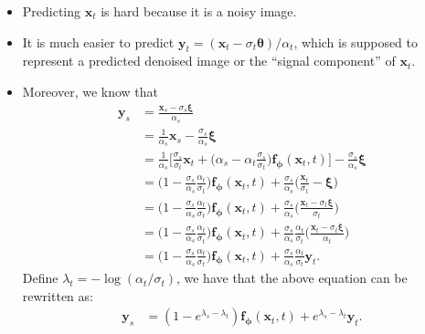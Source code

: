 \documentclass[10pt]{article}
\newcommand{\ve}[1]{\mathbf{#1}}
\newcommand{\ves}[1]{\boldsymbol{#1}}
\begin{document}
\begin{itemize}
  \item Predicting $\ve{x}_t$ is hard because it is a noisy image.
  
  \item It is much easier to predict $\ve{y}_t = (\ve{x}_t - \sigma_t \ves{\theta}) / \alpha_t$, which is supposed to represent a predicted denoised image or the ``signal component'' of $\ve{x}_t$.
  
  \item Moreover, we know that
  \begin{align*}
    \ve{y}_s 
    &= \frac{\ve{x}_s - \sigma_s \ves{\xi}}{\alpha_s} \\
    &= \frac{1}{\alpha_s} \ve{x}_s - \frac{\sigma_s}{\alpha_s} \ves{\xi} \\
    &= \frac{1}{\alpha_s} \bigg[ \frac{\sigma_s}{\sigma_t} \ve{x}_t + \bigg( \alpha_s - \alpha_t \frac{\sigma_s}{\sigma_t} \bigg) \ve{f}_{\ves{\phi}}(\ve{x}_t, t) \bigg] - \frac{\sigma_s}{\alpha_s} \ves{\xi} \\
    &= \bigg( 1 - \frac{\sigma_s}{\alpha_s} \frac{\alpha_t}{\sigma_t} \bigg) \ve{f}_{\ves{\phi}}(\ve{x}_t, t) 
    + \frac{\sigma_s}{\alpha_s} \bigg(\frac{\ve{x}_t}{\sigma_t} - \ves{\xi} \bigg) \\
    &= \bigg( 1 - \frac{\sigma_s}{\alpha_s} \frac{\alpha_t}{\sigma_t} \bigg) \ve{f}_{\ves{\phi}}(\ve{x}_t, t) 
    + \frac{\sigma_s}{\alpha_s} \bigg(\frac{\ve{x}_t - \sigma_t \ves{\xi} }{\sigma_t} \bigg) \\
    &= \bigg( 1 - \frac{\sigma_s}{\alpha_s} \frac{\alpha_t}{\sigma_t} \bigg) \ve{f}_{\ves{\phi}}(\ve{x}_t, t) 
    + \frac{\sigma_s}{\alpha_s} \frac{\alpha_t}{\sigma_t} \bigg(\frac{\ve{x}_t - \sigma_t \ves{\xi} }{\alpha_t} \bigg) \\
    &= \bigg( 1 - \frac{\sigma_s}{\alpha_s} \frac{\alpha_t}{\sigma_t} \bigg) \ve{f}_{\ves{\phi}}(\ve{x}_t, t) 
    + \frac{\sigma_s}{\alpha_s} \frac{\alpha_t}{\sigma_t} \ve{y}_t.
  \end{align*}
  Define $\lambda_t = -\log (\alpha_t / \sigma_t)$, we have that the above equation can be rewritten as:
  \begin{align*}
    \ve{y}_s &= (1 - e^{\lambda_s - \lambda_t}) \ve{f}_{\ves{\phi}}(\ve{x}_t, t)  + e^{\lambda_s - \lambda_t} \ve{y}_t.
  \end{align*}


\end{itemize}
\end{document}
